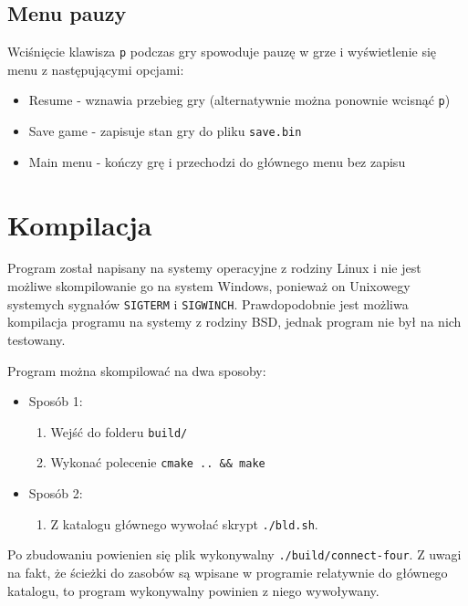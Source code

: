 \documentclass{article}
\begin{document}
\subsection*{Menu pauzy}

Wciśnięcie klawisza \texttt{p} podczas gry spowoduje pauzę w grze i wyświetlenie się menu z następującymi opcjami:
\begin{itemize}
    \item Resume - wznawia przebieg gry (alternatywnie można ponownie wcisnąć \texttt{p})
    \item Save game - zapisuje stan gry do pliku \texttt{save.bin}
    \item Main menu - kończy grę i przechodzi do głównego menu bez zapisu
\end{itemize}

\section{Kompilacja}

Program został napisany na systemy operacyjne z rodziny Linux i nie jest możliwe skompilowanie go na system Windows,
ponieważ on Unixowegy systemych sygnałów \texttt{SIGTERM} i \texttt{SIGWINCH}. Prawdopodobnie jest możliwa kompilacja
programu na systemy z rodziny BSD, jednak program nie był na nich testowany.

Program można skompilować na dwa sposoby:
    \begin{itemize}
         
    \item Sposób 1:
        \begin{enumerate}
            \item Wejść do folderu  \texttt{build/}
            \item Wykonać polecenie \texttt{cmake .. \&\& make}
        \end{enumerate}

    \item Sposób 2:
        \begin{enumerate}
            \item Z katalogu głównego wywołać skrypt \texttt{./bld.sh}.
        \end{enumerate}

    \end{itemize}

Po zbudowaniu powienien się plik wykonywalny \texttt{./build/connect-four}.
Z uwagi na fakt, że ścieżki do zasobów są wpisane w programie relatywnie 
do głównego katalogu, to program wykonywalny powinien z niego wywoływany.
\end{document}
